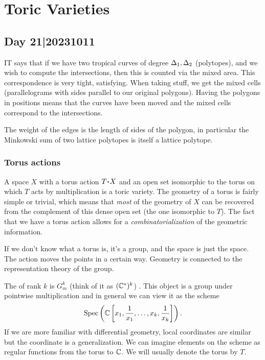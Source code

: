 \documentclass[12pt]{memoir}
\theoremstyle{definition}
\begin{document}
\chapter{Toric Varieties}
\section{Day 21|20231011}

IT says that if we have two tropical curves of degree $\Delta_1,\Delta_2$ (polytopes), and we wish to compute the intersections, then this is counted via the mixed area. This correspondence is very tight, satisfying. When taking stuff, we get the mixed cells (parallelograms with sides parallel to our original polygons). Having the polygons in positions means that the curves have been moved and the mixed cells correspond to the intersections.\par 
The weight of the edges is the length of sides of the polygon, in particular the Minkowski sum of two lattice polytopes is itself a lattice polytope.

\subsection{Torus actions}

A space $X$ with a torus action $T\.X$ and an open set isomorphic to the torus on which $T$ acts by multiplication is a toric variety. The geometry of a torus is fairly simple or trivial, which means that \emph{most} of the geometry of $X$ can be recovered from the complement of this dense open set (the one isomorphic to $T$). The fact that we have a torus action allows for a \emph{combinatorialization} of the geometric information.\par 
If we don't know what a torus is, it's a group, and the space is just the space. The action moves the points in a certain way. Geometry is connected to the representation theory of the group.

\begin{Def}
    The  of rank $k$ is $G_m^k$ (think of it as $(\mathbb{C}^\ast)^k$) . This object is a group under pointwise multiplication and in general we can view it as the scheme 
    $$\operatorname{Spec}\left(\mathbb{C}\left\lbrack x_1,\frac{1}{x_1},\dots,x_k,\frac{1}{x_k}\right\rbrack\right).$$
    If we are more familiar with differential geometry, local coordinates are similar but the coordinate is a generalization. We can imagine elements on the scheme as regular functions from the torus to $\mathbb{C}$. We will usually denote the torus by $T$.
\end{Def}
\end{document}
